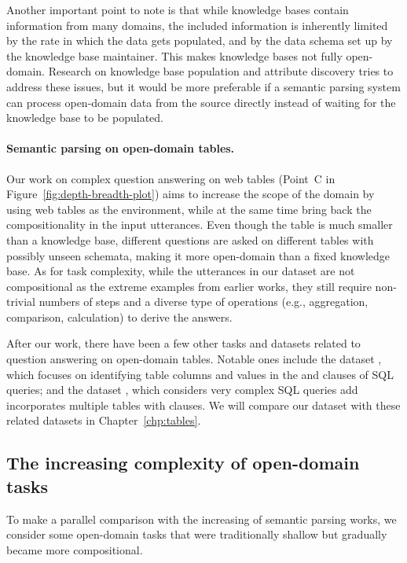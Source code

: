 Another important point to note is that while knowledge bases
contain information from many domains,
the included information is inherently limited
by the rate in which the data gets populated,
and by the data schema set up by the knowledge base maintainer.
This makes knowledge bases not fully open-domain.
Research on knowledge base population \cite{ji2011knowledge,ellis2015tackbp,stanford2017kbp}
and attribute discovery \cite{cafarella2008webtables,yakout2012infogather}
tries to address these issues,
but it would be more preferable if a semantic parsing system
can process open-domain data from the source directly
instead of waiting for the knowledge base to be populated.

\paragraph{Semantic parsing on open-domain tables.}
Our work on complex question answering on web tables
(Point~C in Figure~\ref{fig:depth-breadth-plot})
aims to increase the scope of the domain
by using web tables as the environment,
while at the same time bring back the compositionality
in the input utterances.
Even though the table is much smaller than a knowledge base,
different questions are asked on different tables
with possibly unseen schemata,
making it more open-domain than a fixed knowledge base.
As for task complexity,
while the utterances in our dataset are not compositional
as the extreme examples from earlier works,
they still require non-trivial numbers of steps
and a diverse type of operations (e.g., aggregation,
comparison, calculation) to derive the answers.

After our work, there have been a few other tasks
and datasets related to question answering on open-domain tables.
Notable ones include the  dataset
\cite{zhong2017seq2sql},
which focuses on identifying table columns and values
in the  and  clauses of SQL queries;
and the  dataset
\cite{yu2018syntaxsqlnet,yu2018spider},
which considers very complex SQL queries add incorporates
multiple tables with  clauses.
We will compare our dataset with these related datasets
in Chapter~\ref{chp:tables}.

\subsection{The increasing complexity of open-domain tasks}
\label{sec:intro-open-domain}

To make a parallel comparison with the increasing \Breadth of
semantic parsing works,
we consider some open-domain tasks that were traditionally shallow
but gradually became more compositional.


